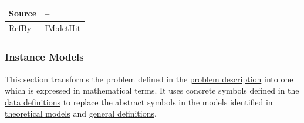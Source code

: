 \documentclass[12pt]{article}
\begin{document}
\begin{minipage}{\textwidth}
\begin{tabular}{>{\raggedright}p{}>{\raggedright\arraybackslash}p{}}
\\ \midrule
Source & --
         
\\ \midrule
RefBy & \hyperref[IM:detHit]{IM:detHit}
        
\\ \bottomrule
\end{tabular}
\end{minipage}

\subsubsection{Instance Models}
\label{Sec:IMs}
This section transforms the problem defined in the \hyperref[Sec:ProbDesc]{problem description} into one which is expressed in mathematical terms. It uses concrete symbols defined in the \hyperref[Sec:DDs]{data definitions} to replace the abstract symbols in the models identified in \hyperref[Sec:TMs]{theoretical models} and \hyperref[Sec:GDs]{general definitions}.
\end{document}
